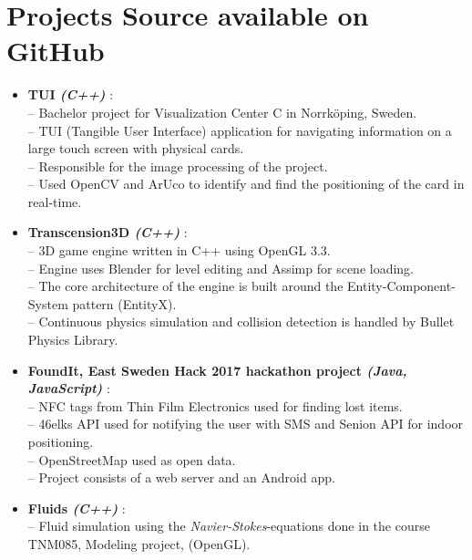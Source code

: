 \documentclass[letterpaper,11pt]{article}
\newcommand{\resumeItem}[2]{
  \item\small{
    \textbf{#1}{: #2 \vspace{-2pt}}
  }
}
\newcommand{\resumeSubItem}[2]{\resumeItem{#1}{#2}\vspace{-4pt}}
\newcommand{\resumeSubHeadingListStart}{\begin{itemize}[leftmargin=*]}
\newcommand{\resumeSubHeadingListEnd}{\end{itemize}}
\begin{document}
\section{Projects Source available on GitHub}
  \resumeSubHeadingListStart
    \resumeSubItem{\textmu{}TUI \textit{(C++)} }
      { \\
      \indent-- Bachelor project for Visualization Center C in Norrköping, Sweden. \\
      \indent-- TUI (Tangible User Interface) application for navigating information on a large touch screen with physical cards.\\
      \indent-- Responsible for the image processing of the project.\\
      \indent-- Used OpenCV and ArUco to identify and find the positioning of the card in real-time.\\}
    \resumeSubItem{Transcension3D \textit{(C++)} }
      { \\ 
      \indent-- 3D game engine written in C++ using OpenGL 3.3. \\
      \indent-- Engine uses Blender for level editing and Assimp for scene loading. \\
      \indent-- The core architecture of the engine is built around the Entity-Component-System pattern (EntityX). \\
      \indent-- Continuous physics simulation and collision detection is handled by Bullet Physics Library.}
      
      \resumeSubItem{FoundIt, East Sweden Hack 2017 hackathon project \textit{(Java, JavaScript)} }
      { \\ 
      \indent-- NFC tags from Thin Film Electronics used for finding lost items.\\
      \indent-- 46elks API used for notifying the user with SMS and Senion API for indoor positioning.\\
      \indent-- OpenStreetMap used as open data.\\
      \indent-- Project consists of a web server and an Android app.\\
      }
    \resumeSubItem{Fluids \textit{(C++)} }
       {\\ 
       \indent-- Fluid simulation using the \textit{Navier-Stokes}-equations done in the course TNM085, Modeling project, (OpenGL).}

  \resumeSubHeadingListEnd

\end{document}
